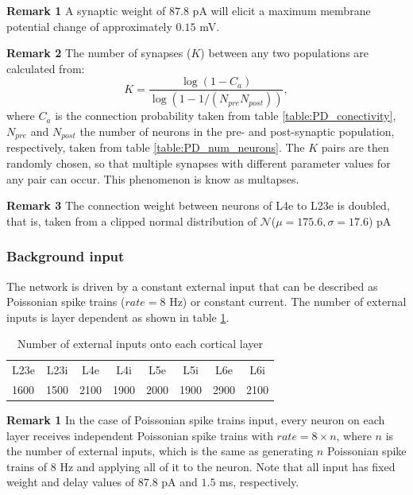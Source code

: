 \documentclass[11pt]{scrartcl}
\begin{document}
\textbf{Remark 1} A synaptic weight of \(87.8\) pA will elicit a maximum membrane potential change of approximately \(0.15\) mV.

\textbf{Remark 2} The number of synapses (\(K\)) between any two populations are calculated from:
\begin{equation}
    K = \frac{\log(1 - C_a)}{\log(1-1/(N_{pre}N_{post}))},
    \label{eq:PD_K}
\end{equation}
where \(C_a\) is the connection probability taken from table \ref{table:PD_conectivity}, \(N_{pre}\) and \(N_{post}\) the number of neurons in the pre- and post-synaptic population, respectively, taken from table \ref{table:PD_num_neurons}. The \(K\) pairs are then randomly chosen, so that multiple synapses with different parameter values for any pair can occur. This phenomenon is know as multapses.

\textbf{Remark 3} The connection weight between neurons of L4e to L23e is doubled, that is, taken from a clipped normal distribution of \(\mathcal{N}\)(\(\mu = 175.6, \sigma = 17.6\)) pA

\subsubsection{Background input}
\label{sec:org17601e4}
\label{org111cc73}

The network is driven by a constant external input that can be described as Poissonian spike trains (\(rate = 8\) Hz) or constant current. The number of external inputs is layer dependent as shown in table \ref{table:PD_ext_num_neurons}.

\begin{table}[htbp]
    \centering
    \caption{Number of external inputs onto each cortical layer}
    \label{table:PD_ext_num_neurons}
    \begin{tabular}{llllllll}
         \multicolumn{1}{c}{L23e} & \multicolumn{1}{c}{L23i} & \multicolumn{1}{c}{L4e} & \multicolumn{1}{c}{L4i} & \multicolumn{1}{c}{L5e} & \multicolumn{1}{c}{L5i} & \multicolumn{1}{c}{L6e} & \multicolumn{1}{c}{L6i} \\
         1600 & 1500 & 2100 & 1900 & 2000 & 1900 & 2900 & 2100 
    \end{tabular}
\end{table}

\textbf{Remark 1} In the case of Poissonian spike trains input, every neuron on each layer receives independent Poissonian spike trains with \(rate = 8 \times n\), where \(n\) is the number of external inputs, which is the same as generating \(n\) Poissonian spike trains of \(8\) Hz and applying all of it to the neuron. Note that all input has fixed weight and delay values of \(87.8\) pA and \(1.5\) ms, respectively.
\end{document}
